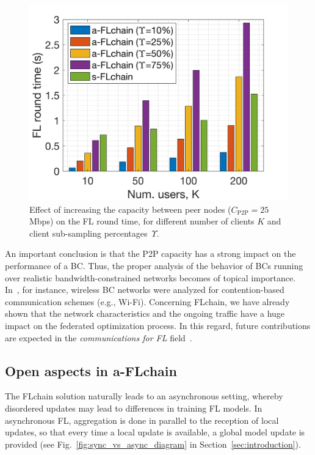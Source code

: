 \documentclass[10pt,journal,compsoc]{IEEEtran}
\begin{document}
\begin{figure}[ht!]
	\centering
	\includegraphics[width=.7\linewidth]{img/2_fl_round_time_more_capacity.png}
	\caption{Effect of increasing the capacity between peer nodes ($C_\text{P2P}=25$ Mbps) on the FL round time, for different number of clients $K$ and client sub-sampling percentages~$\Upsilon$.}
	\label{fig:fl_round_time_more_capacity}
\end{figure}

An important conclusion is that the P2P capacity has a strong impact on the performance of a BC. Thus, the proper analysis of the behavior of BCs running over realistic bandwidth-constrained networks becomes of topical importance. In~\cite{wilhelmi2021performance}, for instance, wireless BC networks were analyzed for contention-based communication schemes (e.g., Wi-Fi). Concerning FLchain, we have already shown that the network characteristics and the ongoing traffic have a huge impact on the federated optimization process. In this regard, future contributions are expected in the \emph{communications for FL} field~\cite{chen2020wireless}.


\subsection{Open aspects in a-FLchain}
\label{section:open_aspects_aflchain}

The FLchain solution naturally leads to an asynchronous setting, whereby disordered updates may lead to differences in training FL models. In asynchronous FL, aggregation is done in parallel to the reception of local updates, so that every time a local update is available, a global model update is provided (see Fig.~\ref{fig:sync_vs_async_diagram} in Section~\ref{sec:introduction}).
\end{document}
